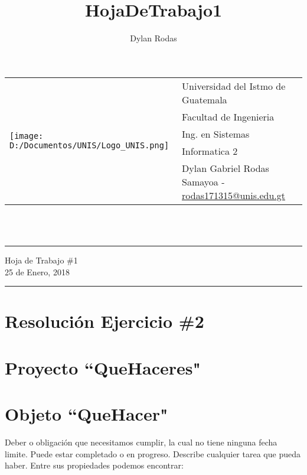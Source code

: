 \documentclass[10pt,a4paper]{article}
\author{Dylan Rodas}
\title{HojaDeTrabajo1}
\newcommand{\horrule}[1]{\rule{\linewidth}{#1}}
\begin{document}
	\begin{tabular}{l l}
     \multirow{5}{*}{\texttt{[image: D:/Documentos/UNIS/Logo\_UNIS.png]}} & Universidad del Istmo de Guatemala \\
     & Facultad de Ingenieria \\
     & Ing. en Sistemas \\
     & Informatica 2 \\
     & Dylan Gabriel Rodas Samayoa - \href{mailto:rodas171315@unis.edu.gt}{rodas171315@unis.edu.gt} \\
    \end{tabular}
	\\\    
	
    \begin{center}
        \horrule{0.5pt}
        \huge{Hoja de Trabajo \#1} \\
        \large{25 de Enero, 2018} \\
        \horrule{1pt}
	\end{center}

	\begin{center}
	\section*{Resolución Ejercicio \#2}
	\section*{Proyecto ``QueHaceres"}
	\end{center}

	\section*{Objeto ``QueHacer"}
	
Deber o obligación que necesitamos cumplir, la cual no tiene ninguna fecha limite. Puede estar completado o en progreso. Describe cualquier tarea que pueda haber. Entre sus propiedades podemos encontrar:
\end{document}

